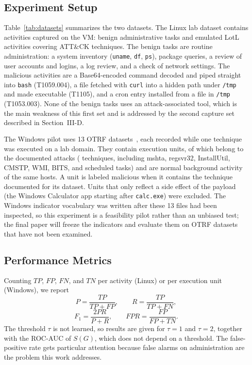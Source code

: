 \documentclass[conference]{IEEEtran}
\begin{document}
\subsection{Experiment Setup}

Table~\ref{tab:datasets} summarizes the two datasets. The Linux lab dataset
contains \LinTotal{} activities captured on the VM: \LinBenign{} benign
administrative tasks and \LinMal{} emulated LotL activities covering
\LinTech{} ATT\&CK techniques. The benign tasks are routine administration:
a system inventory (\texttt{uname}, \texttt{df}, \texttt{ps}), package
queries, a review of user accounts and logins, a log review, and a check of
network settings. The malicious activities are a Base64-encoded command
decoded and piped straight into \texttt{bash} (T1059.004), a file fetched
with \texttt{curl} into a hidden path under \texttt{/tmp} and made executable
(T1105), and a cron entry installed from a file in \texttt{/tmp}
(T1053.003). None of the benign tasks uses an attack-associated tool, which
is the main weakness of this first set and is addressed by the second
capture set described in Section~III-D.

The Windows pilot uses 13 OTRF datasets~\cite{otrf2020datasets}, each
recorded while one technique was executed on a lab domain. They contain
\WinTotal{} execution units, of which \WinMal{} belong to the documented
attacks (\WinTech{} techniques, including mshta, regsvr32, InstallUtil,
CMSTP, WMI, BITS, and scheduled tasks) and \WinBenign{} are normal background
activity of the same hosts. A unit is labeled malicious when it contains the
technique documented for its dataset. Units that only reflect a side effect
of the payload (the Windows Calculator app starting after \texttt{calc.exe})
were excluded. The Windows indicator vocabulary was written after these 13
files had been inspected, so this experiment is a feasibility pilot rather
than an unbiased test; the final paper will freeze the indicators and
evaluate them on OTRF datasets that have not been examined.

\subsection{Performance Metrics}
Counting $TP$, $FP$, $FN$, and $TN$ per activity (Linux) or per execution
unit (Windows), we report
\begin{equation}
P=\frac{TP}{TP+FP},\qquad R=\frac{TP}{TP+FN},
\end{equation}
\begin{equation}
F_1=\frac{2PR}{P+R},\qquad \mathit{FPR}=\frac{FP}{FP+TN}.
\end{equation}
The threshold $\tau$ is not learned, so results are given for $\tau=1$ and
$\tau=2$, together with the ROC-AUC of $S(G)$, which does not depend on a
threshold. The false-positive rate gets particular attention because false
alarms on administration are the problem this work addresses.
\end{document}
